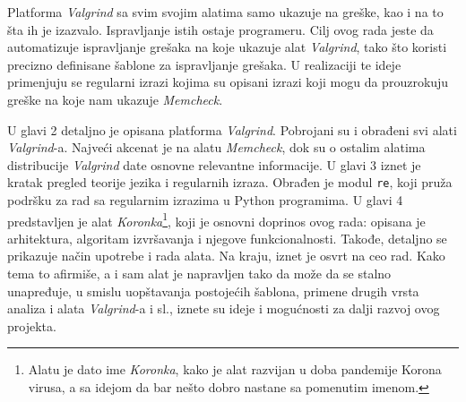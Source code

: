 \documentclass[12pt,oneside]{memoir}
\theoremstyle{plain}
\theoremstyle{definition}
\begin{document}
Platforma \textit{Valgrind} sa svim svojim alatima samo ukazuje na greške, kao i na to šta ih je izazvalo. Ispravljanje istih ostaje programeru. Cilj ovog rada jeste da automatizuje ispravljanje grešaka na koje ukazuje alat \textit{Valgrind}, tako što koristi precizno definisane šablone za ispravljanje grešaka. U realizaciji te ideje primenjuju se regularni izrazi kojima su opisani izrazi koji mogu da prouzrokuju greške na koje nam ukazuje \textit{Memcheck}.

U glavi 2 detaljno je opisana platforma \textit{Valgrind}. Pobrojani su i obrađeni svi alati \textit{Valgrind}-a. Najveći akcenat je na alatu \textit{Memcheck}, dok su o ostalim alatima distribucije \textit{Valgrind} date osnovne relevantne informacije. U glavi 3 iznet je kratak pregled teorije jezika i regularnih izraza. Obrađen je modul \texttt{re}, koji pruža podršku za rad sa regularnim izrazima u Python programima. U glavi 4 predstavljen je alat \textit{Koronka}\footnote{Alatu je dato ime \textit{Koronka}, kako je alat razvijan u doba pandemije Korona virusa, a sa idejom da bar nešto dobro nastane sa pomenutim imenom.}, koji je osnovni doprinos ovog rada: opisana je arhitektura, algoritam izvršavanja i njegove funkcionalnosti. Takođe, detaljno se prikazuje način upotrebe i rada alata. Na kraju, iznet je osvrt na ceo rad. Kako tema to afirmiše, a i sam alat je napravljen tako da može da se stalno unapređuje, u smislu uopštavanja postojećih šablona, primene drugih vrsta analiza i alata \textit{Valgrind}-a i sl., iznete su ideje i mogućnosti za dalji razvoj ovog projekta.
\end{document}

